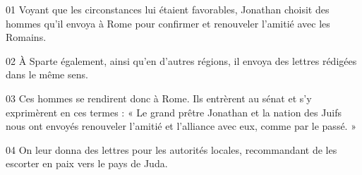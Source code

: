 01 Voyant que les circonstances lui étaient favorables, Jonathan choisit des hommes qu’il envoya à Rome pour confirmer et renouveler l’amitié avec les Romains.

02 À Sparte également, ainsi qu’en d’autres régions, il envoya des lettres rédigées dans le même sens.

03 Ces hommes se rendirent donc à Rome. Ils entrèrent au sénat et s’y exprimèrent en ces termes : « Le grand prêtre Jonathan et la nation des Juifs nous ont envoyés renouveler l’amitié et l’alliance avec eux, comme par le passé. »

04 On leur donna des lettres pour les autorités locales, recommandant de les escorter en paix vers le pays de Juda.

